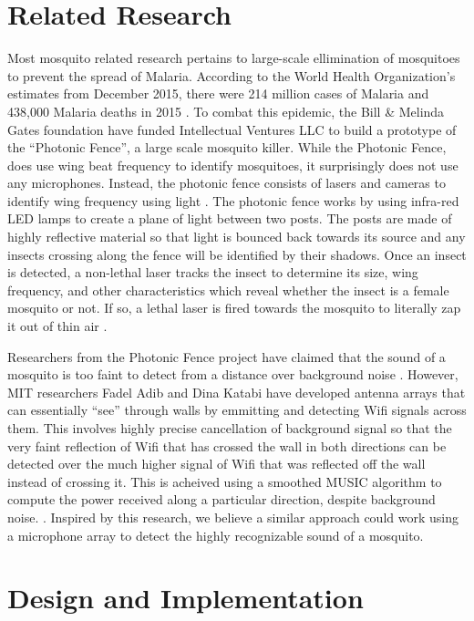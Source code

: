 \documentclass[twoside]{article}
\begin{document}
\begin{multicols}{2}
\section{Related Research}
Most mosquito related research pertains to large-scale ellimination of mosquitoes to prevent the spread of Malaria. According to the World Health Organization's estimates from December 2015, there were 214 million cases of Malaria and 438,000 Malaria deaths in 2015 \cite{malaria}. To combat this epidemic, the Bill \& Melinda Gates foundation have funded Intellectual Ventures LLC to build a prototype of the ``Photonic Fence'', a large scale mosquito killer. While the Photonic Fence, does use wing beat frequency to identify mosquitoes, it surprisingly does not use any microphones. Instead, the photonic fence consists of lasers and cameras to identify wing frequency using light \cite{photonicFence}. The photonic fence works by using infra-red LED lamps to create a plane of light between two posts. The posts are made of highly reflective material so that light is bounced back towards its source and any insects crossing along the fence will be identified by their shadows. Once an insect is detected, a non-lethal laser tracks the insect to determine its size, wing frequency, and other characteristics which reveal whether the insect is a female mosquito or not. If so, a lethal laser is fired towards the mosquito to literally zap it out of thin air \cite{photonicFenceWiki}. 

Researchers from the Photonic Fence project have claimed that the sound of a mosquito is too faint to detect from a distance over background noise \cite{photonicFence}. However, MIT researchers Fadel Adib and Dina Katabi have developed antenna arrays that can essentially ``see'' through walls by emmitting and detecting Wifi signals across them. This involves highly precise cancellation of background signal so that the very faint reflection of Wifi that has crossed the wall in both directions can be detected over the much higher signal of Wifi that was reflected off the wall instead of crossing it. This is acheived using a smoothed MUSIC algorithm to compute the power received along a particular direction, despite background noise. \cite{wivi}. Inspired by this research, we believe a similar approach could work using a microphone array to detect the highly recognizable sound of a mosquito. 


\section{Design and Implementation}


\end{multicols}
\end{document}
